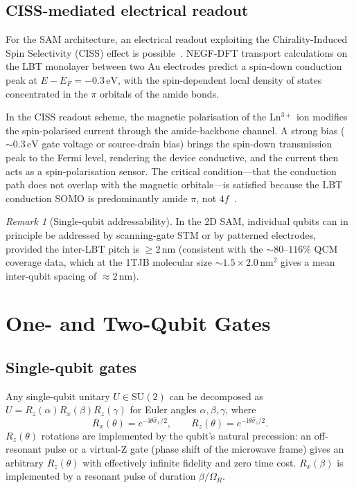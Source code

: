 \documentclass[11pt,oneside]{amsbook}
\numberwithin{equation}{section}
\theoremstyle{plain}
\theoremstyle{definition}
\theoremstyle{remark}
\newtheorem{remark}[theorem]{Remark}
\begin{document}
\subsection{CISS-mediated electrical readout}
\label{subsec:pqpu_CISS}

For the SAM architecture, an electrical readout exploiting the
Chirality-Induced Spin Selectivity (CISS) effect is
possible~\cite{RosalenyEtAl2017}.  NEGF-DFT transport calculations on the LBT
monolayer between two Au electrodes predict a spin-down conduction peak at
$E - E_F = -0.3\,\text{eV}$, with the spin-dependent local density of states
concentrated in the $\pi$ orbitals of the amide bonds.

In the CISS readout scheme, the magnetic polarisation of the Ln$^{3+}$ ion
modifies the spin-polarised current through the amide-backbone channel.  A
strong bias ($\sim 0.3\,\text{eV}$ gate voltage or source-drain bias) brings the
spin-down transmission peak to the Fermi level, rendering the device
conductive, and the current then acts as a spin-polarisation sensor.  The
critical condition---that the conduction path does not overlap with the magnetic
orbitals---is satisfied because the LBT conduction SOMO is predominantly amide
$\pi$, not $4f$~\cite{RosalenyEtAl2017}.

\begin{remark}[Single-qubit addressability]
In the 2D SAM, individual qubits can in principle be addressed by scanning-gate
STM or by patterned electrodes, provided the inter-LBT pitch is $\ge 2\,\text{nm}$
(consistent with the $\sim 80$--$116\%$ QCM coverage data, which at the
1TJB molecular size $\sim 1.5 \times 2.0\,\text{nm}^2$ gives a mean inter-qubit
spacing of $\approx 2\,\text{nm}$).
\end{remark}

\section{One- and Two-Qubit Gates}
\label{sec:pqpu_gates}

\subsection{Single-qubit gates}
\label{subsec:pqpu_1q_gates}

Any single-qubit unitary $U \in \mathrm{SU}(2)$ can be decomposed as
$U = R_z(\alpha) R_x(\beta) R_z(\gamma)$ for Euler angles $\alpha, \beta, \gamma$,
where
\[
  R_x(\theta) = e^{-\mathrm{i}\theta\hat\sigma_x/2},
  \qquad
  R_z(\theta) = e^{-\mathrm{i}\theta\hat\sigma_z/2}.
\]
$R_z(\theta)$ rotations are implemented by the qubit's natural precession: an
off-resonant pulse or a virtual-Z gate (phase shift of the microwave frame)
gives an arbitrary $R_z(\theta)$ with effectively infinite fidelity and zero
time cost.  $R_x(\beta)$ is implemented by a resonant pulse of duration
$\beta/\Omega_R$.
\end{document}

